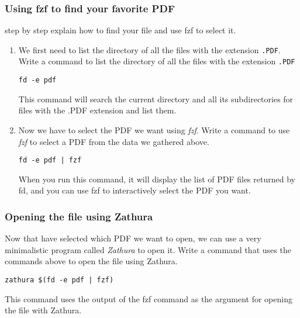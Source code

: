 \documentclass[titlepage]{article}
\begin{document}
	\subsubsection{Using fzf to find your favorite PDF}
	step by step explain how to find your file and use fzf to select it.
	
	\begin{enumerate}
		\item We first need to list the directory of all the files with the extension \texttt{.PDF}. Write a command to list the directory of all the files with the extension \texttt{.PDF}
		
		\texttt{fd -e pdf}
		
		This command will search the current directory and all its subdirectories for files with the .PDF extension and list them.
	
		\item Now we have to select the PDF we want using \textit{fzf}. Write a command to use \textit{fzf} to select a PDF from the data we gathered above.
		
		\texttt{fd -e pdf | fzf}
		
		When you run this command, it will display the list of PDF files returned by fd, and you can use fzf to interactively select the PDF you want.
		
	\end{enumerate}

	\subsubsection{Opening the file using Zathura}
	Now that have selected which PDF we want to open, we can use a very minimalistic program called \textit{Zathura} to open it. Write a command that uses the commands above to open the file using Zathura.
	
	\texttt{zathura \$(fd -e pdf | fzf)}
	
	This command uses the output of the fzf command as the argument for opening the file with Zathura.
	
	
	
\end{document}
